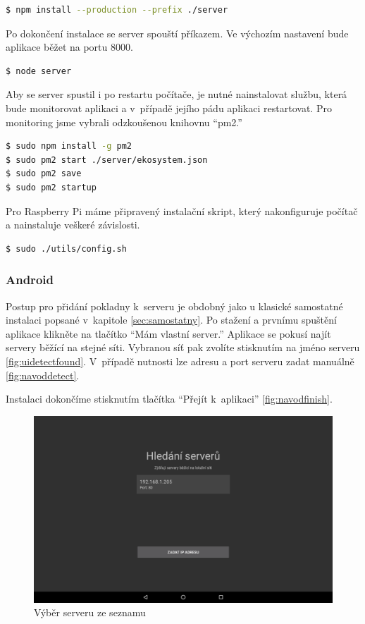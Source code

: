 \documentclass[a4paper,11pt,oneside]{article}
\begin{document}
\begin{lstlisting}[language=bash, caption={Bash}]
$ npm install --production --prefix ./server
\end{lstlisting}

Po dokončení instalace se server spouští příkazem. Ve výchozím nastavení bude aplikace běžet na portu 8000. 

\begin{lstlisting}[language=bash, caption={Bash}]
$ node server
\end{lstlisting}

Aby se server spustil i po restartu počítače, je nutné nainstalovat službu, která bude monitorovat aplikaci a v~případě jejího pádu aplikaci restartovat. Pro monitoring jsme vybrali odzkoušenou knihovnu \enquote{pm2.}

\begin{lstlisting}[language=bash, caption={Bash}]
$ sudo npm install -g pm2
$ sudo pm2 start ./server/ekosystem.json
$ sudo pm2 save
$ sudo pm2 startup
\end{lstlisting}

Pro Raspberry Pi máme připravený instalační skript, který nakonfiguruje počítač a nainstaluje veškeré závislosti. 

\begin{lstlisting}[language=bash, caption={Bash}]
$ sudo ./utils/config.sh
\end{lstlisting}

\subsubsection{Android}

Postup pro přidání pokladny k~serveru je obdobný jako u klasické samostatné instalaci popsané v~kapitole \ref{sec:samostatny}. Po stažení a prvnímu spuštění aplikace klikněte na tlačítko \enquote{Mám vlastní server.} Aplikace se pokusí najít servery běžící na stejné síti. Vybranou síť pak zvolíte stisknutím na jméno serveru \eqref{fig:uidetectfound}. V~případě nutnosti lze adresu a port serveru zadat manuálně \eqref{fig:navoddetect}. 

Instalaci dokončíme stisknutím tlačítka \enquote{Přejít k~aplikaci} \eqref{fig:navodfinish}.

\begin{figure}[H]
	\centering
	\includegraphics[width=0.6\linewidth]{../ui_detect_found}
	\caption{Výběr serveru ze seznamu}
	\label{fig:uidetectfound}
\end{figure}
\end{document}
